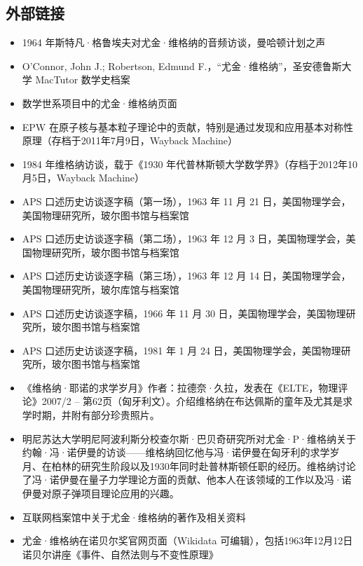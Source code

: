 \subsection{外部链接}
\begin{itemize}
\item 1964 年斯特凡·格鲁埃夫对尤金·维格纳的音频访谈，曼哈顿计划之声
\item O'Connor, John J.; Robertson, Edmund F.，“尤金·维格纳”，圣安德鲁斯大学 MacTutor 数学史档案
\item 数学世系项目中的尤金·维格纳页面
\item EPW 在原子核与基本粒子理论中的贡献，特别是通过发现和应用基本对称性原理（存档于2011年7月9日，Wayback Machine）
\item 1984 年维格纳访谈，载于《1930 年代普林斯顿大学数学界》（存档于2012年10月5日，Wayback Machine）
\item APS 口述历史访谈逐字稿（第一场），1963 年 11 月 21 日，美国物理学会，美国物理研究所，玻尔图书馆与档案馆
\item APS 口述历史访谈逐字稿（第二场），1963 年 12 月 3 日，美国物理学会，美国物理研究所，玻尔图书馆与档案馆
\item APS 口述历史访谈逐字稿（第三场），1963 年 12 月 14 日，美国物理学会，美国物理研究所，玻尔库馆与档案馆
\item APS 口述历史访谈逐字稿，1966 年 11 月 30 日，美国物理学会，美国物理研究所，玻尔图书馆与档案馆
\item APS 口述历史访谈逐字稿，1981 年 1 月 24 日，美国物理学会，美国物理研究所，玻尔图书馆与档案馆
\item 《维格纳·耶诺的求学岁月》作者：拉德奈·久拉，发表在《ELTE，物理评论》2007/2 – 第62页（匈牙利文）。介绍维格纳在布达佩斯的童年及尤其是求学时期，并附有部分珍贵照片。
\item 明尼苏达大学明尼阿波利斯分校查尔斯·巴贝奇研究所对尤金·P·维格纳关于约翰·冯·诺伊曼的访谈——维格纳回忆他与冯·诺伊曼在匈牙利的求学岁月、在柏林的研究生阶段以及1930年同时赴普林斯顿任职的经历。维格纳讨论了冯·诺伊曼在量子力学理论方面的贡献、他本人在该领域的工作以及冯·诺伊曼对原子弹项目理论应用的兴趣。
\item 互联网档案馆中关于尤金·维格纳的著作及相关资料
\item 尤金·维格纳在诺贝尔奖官网页面（Wikidata 可编辑），包括1963年12月12日诺贝尔讲座《事件、自然法则与不变性原理》
\end{itemize}

